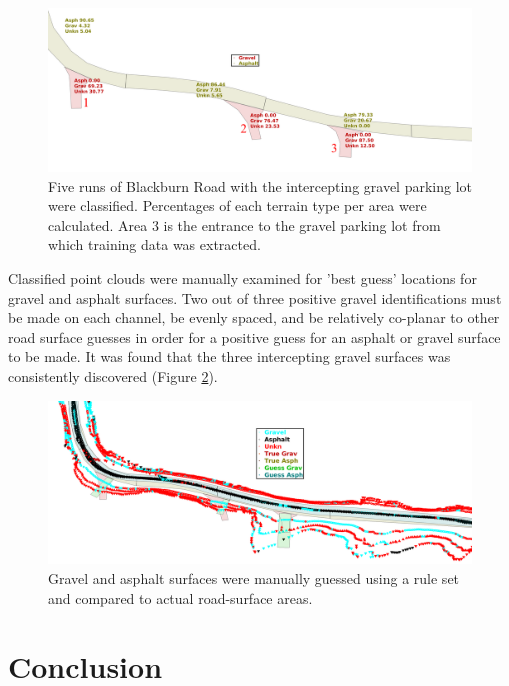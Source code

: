 \documentclass[journal,onecolumn]{IEEEtran}
\begin{document}
	
	\begin{figure}[H]
		\centering
		\includegraphics[width=0.9\linewidth]{figures/rm_db_4_percentages_big_anotated}
		\caption[Area Percentage Scores]{Five runs of Blackburn Road with the intercepting gravel parking lot were classified. Percentages of each terrain type per area were calculated. Area $3$ is the entrance to the gravel parking lot from which training data was extracted.}
		\label{fig:area_percentages}
	\end{figure}

	{Classified point clouds were manually examined for 'best guess' locations for gravel and asphalt surfaces. Two out of three positive gravel identifications must be made on each channel, be evenly spaced, and be relatively co-planar to other road surface guesses in order for a positive guess for an asphalt or gravel surface to be made. It was found that the three intercepting gravel surfaces was consistently discovered (Figure \ref{fig:rm_db_4_toc}).}
	
	\begin{figure}[H]
		\centering
		\includegraphics[width=0.9\linewidth]{figures/rm_db_4_toc}
		\caption[Projected Guess vs Truth]{Gravel and asphalt surfaces were manually guessed using a rule set and compared to actual road-surface areas. }
		\label{fig:rm_db_4_toc}
	\end{figure}
	
\section{Conclusion}
	
\end{document}
